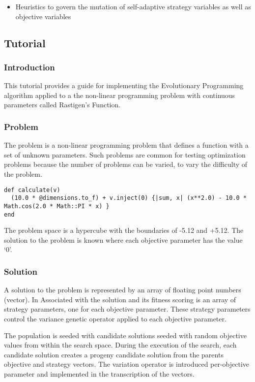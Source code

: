 \begin{itemize}
	\item Heuristics to govern the mutation of self-adaptive strategy variables as well as objective variables
\end{itemize}

\subsection{Tutorial}

\subsubsection{Introduction}
This tutorial provides a guide for implementing the Evolutionary Programming algorithm applied to a the non-linear programming problem with continuous parameters called Rastigen's Function.

\subsubsection{Problem}
The problem is a non-linear programming problem that defines a function with a set of unknown parameters. Such problems are common for testing optimization problems because the number of problems can be varied, to vary the difficulty of the problem. 

\begin{lstlisting}
def calculate(v)
  (10.0 * @dimensions.to_f) + v.inject(0) {|sum, x| (x**2.0) - 10.0 * Math.cos(2.0 * Math::PI * x) }
end
\end{lstlisting}

The problem space is a hypercube with the boundaries of -5.12 and +5.12. The solution to the problem is known where each objective parameter has the value `0'.

\subsubsection{Solution}
A solution to the problem is represented by an array of floating point numbers (vector). In Associated with the solution and its fitness scoring is an array of strategy parameters, one for each objective parameter. These strategy parameters control the variance genetic operator applied to each objective parameter. 

The population is seeded with candidate solutions seeded with random objective values from within the search space. During the execution of the search, each candidate solution creates a progeny candidate solution from the parents objective and strategy vectors. The variation operator is introduced per-objective parameter and implemented in the transcription of the vectors.

